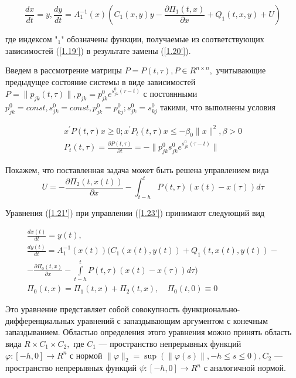 \begin{equation} \label{1.21'}
\frac{dx}{dt} = y, \frac{dy}{dt} = A^{-1}_1(x) (C_1(x, y) y - \frac{\partial \Pi_1 (t, x)}{\partial x} + Q_1 (t, x, y) + U)
\end{equation}

где индексом "$_1$" обозначены функции, получаемые из соответствующих зависимостей (\ref{1.19'}) в результате замены (\ref{1.20'}).

Введем в рассмотрение матрицы $P = P(t, \tau), P \in R^{n \times n},$ учитывающие предыдущее состояние системы в виде зависимостей $P = \| p_{jk} (t, \tau) \|, p_{jk} = p_{jk}^0 e^{s_{jk}^0 (\tau - t)}$ с постоянными $p_{jk}^0 = const, s_{jk}^0 = const, p_{jk}^0 = p_{kj}^0; s_{jk}^0 = s_{kj}^0$ такими, что выполнены условия


\begin{equation} \label{1.22'}
	\begin{array}{c}
		x^{'} P (t, \tau) x \ge 0; x^{'} P_t (t, \tau) x \le - \beta_0 \| x \|^2, \beta > 0\\
		P_t(t, \tau) = \frac{\partial P (t, \tau)}{\partial t} = - \| p_{jk}^0 s_{jk}^{0} e^{s_{jk}^0 (\tau - t)} \|
	\end{array}
\end{equation}

Покажем, что поставленная задача может быть решена управлением вида
\begin{equation} \label{1.23'}
U = - \frac{\partial \Pi_2 (t, x(t))}{\partial x} - \int_{t - h}^{t} P(t, \tau) (x(t) - x(\tau)) d \tau
\end{equation}

Уравнения (\ref{1.21'}) при управлении (\ref{1.23'}) принимают следующий вид

\begin{equation} \label{1.24'}
\begin{array}{c}
\frac{d x(t)}{dt}=y(t),\\
\frac{d y(t)}{dt} = A_1^{-1} (x(t)) (C_1(x(t), y(t)) + Q_1(t, x(t), y(t)) -\\- \frac{\partial \Pi_0 (t, x)}{\partial x} - \int \limits_{t - h}^{t} P(t, \tau) (x(t) - x(\tau)) d \tau)\\
\Pi_0 (t, x) = \Pi_1(t, x) + \Pi_2 (t, x), \quad \Pi_0 (t, 0) \equiv 0
\end{array}
\end{equation}

Это уравнение представляет собой совокупность функционально-дифференциальных уравнений с запаздывающим аргументом с конечным запаздыванием. Областью определения этого уравнения можно принять область вида $R \times C_1 \times C_2,$ где $C_1$ --- пространство непрерывных функций $\varphi : [-h, 0] \to R^n$ с нормой $\| \varphi \|_2 = \sup (\| \varphi(s) \|, -h \le s \le 0), C_2$ --- пространство непрерывных функций $\psi : [-h, 0] \to R^n$ с аналогичной нормой.

